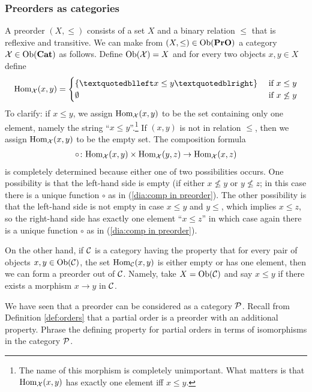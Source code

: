 
\subsubsection{Preorders as categories}\label{sec:preorder as cat}

A preorder $(X,\leq)$ consists of a set $X$ and a binary relation $\leq$ that is reflexive and transitive. We can make from $(X,\leq)\in\textnormal{Ob}({\bf PrO})$ a category $\mathcal{X}\in\textnormal{Ob}({\bf Cat})$ as follows. Define $\textnormal{Ob}(\mathcal{X})=X$ and for every two objects $x,y\in X$ define 
$$\Hom_\mcX(x,y)=\begin{cases}\{“x\leq y”\}&\tn{ if } x\leq y\\\emptyset&\tn{ if } x\not\leq y\end{cases}$$
To clarify: if $x\leq y$, we assign $\textnormal{Hom}_\mathcal{X}(x,y)$ to be the set containing only one element, namely the string “$x\leq y$”.\footnote{The name of this morphism is completely unimportant. What matters is that $\textnormal{Hom}_\mathcal{X}(x,y)$ has exactly one element iff $x\leq y$.} If $(x,y)$ is not in relation $\leq$, then we assign $\textnormal{Hom}_\mathcal{X}(x,y)$ to be the empty set. The composition formula 
\begin{align}\label{dia:comp in preorder}
\circ\colon\textnormal{Hom}_\mathcal{X}(x,y)\times\textnormal{Hom}_\mathcal{X}(y,z)\rightarrow\textnormal{Hom}_\mathcal{X}(x,z)
\end{align}
is completely determined because either one of two possibilities occurs. One possibility is that the left-hand side is empty (if either $x\not\leq y$ or $y\not\leq z$; in this case there is a unique function $\circ$ as in (\ref{dia:comp in preorder}). The other possibility is that the left-hand side is not empty in case $x\leq y$ and $y\leq$, which implies $x\leq z$, so the right-hand side has exactly one element $“x\leq z”$ in which case again there is a unique function $\circ$ as in (\ref{dia:comp in preorder}).

On the other hand, if $\mathcal{C}$ is a category having the property that for every pair of objects $x,y\in\textnormal{Ob}(\mathcal{C})$, the set $\textnormal{Hom}_\mathcal{C}(x,y)$ is either empty or has one element, then we can form a preorder out of $\mathcal{C}$. Namely, take $X=\textnormal{Ob}(\mathcal{C})$ and say $x\leq y$ if there exists a morphism $x\to y$ in $\mathcal{C}$. 

\begin{exercise}
We have seen that a preorder can be considered as a category $\mathcal{P}$. Recall from Definition \ref{def:orders} that a partial order is a preorder with an additional property. Phrase the defining property for partial orders in terms of isomorphisms in the category $\mathcal{P}$.
\end{exercise}

